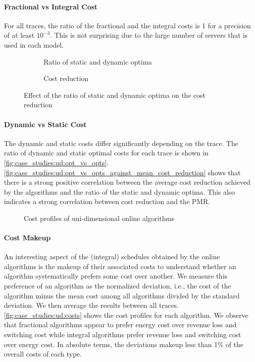 \paragraph{Fractional vs Integral Cost} For all traces, the ratio of the fractional and the integral costs is 1 for a precision of at least $10^{-3}$. This is not surprising due to the large number of servers that is used in each model.

\begin{figure}
    \begin{subfigure}[b]{.5\linewidth}
    \resizebox{\textwidth}{!}{}
    \caption{Ratio of static and dynamic optima}\label{fig:case_studies:ud:opt_vs_opts}
    \end{subfigure}
    \begin{subfigure}[b]{.5\linewidth}
    \resizebox{\textwidth}{!}{}
    \caption{Cost reduction}\label{fig:case_studies:ud:opt_vs_opts_against_mean_cost_reduction}
    \end{subfigure}
    \caption{Effect of the ratio of static and dynamic optima on the cost reduction}
\end{figure}

\paragraph{Dynamic vs Static Cost} The dynamic and static costs differ significantly depending on the trace. The ratio of dynamic and static optimal costs for each trace is shown in \autoref{fig:case_studies:ud:opt_vs_opts}. \autoref{fig:case_studies:ud:opt_vs_opts_against_mean_cost_reduction} shows that there is a strong positive correlation between the average cost reduction achieved by the algorithms and the ratio of the static and dynamic optima. This also indicates a strong correlation between cost reduction and the PMR.

\begin{figure}
    \centering
    
    \caption{Cost profiles of uni-dimensional online algorithms}\label{fig:case_studies:ud:costs}
\end{figure}

\paragraph{Cost Makeup} An interesting aspect of the (integral) schedules obtained by the online algorithms is the makeup of their associated costs to understand whether an algorithm systematically prefers some cost over another. We measure this preference of an algorithm as the normalized deviation, i.e., the cost of the algorithm minus the mean cost among all algorithms divided by the standard deviation. We then average the results between all traces. \autoref{fig:case_studies:ud:costs} shows the cost profiles for each algorithm. We observe that fractional algorithms appear to prefer energy cost over revenue loss and switching cost while integral algorithms prefer revenue loss and switching cost over energy cost. In absolute terms, the deviations makeup less than 1\% of the overall costs of each type.

